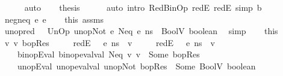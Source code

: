 \begin{isabellebody}
\ \ \ \ \isamarkupfalse%
\ auto\isanewline
\isanewline
\ \ \isamarkupfalse%
\ {\isacharquery}{\kern0pt}thesis\isanewline
\ \ \ \ \isamarkupfalse%
\ {\isacharparenleft}{\kern0pt}auto\ intro{\isacharcolon}{\kern0pt}\ RedBinOp\ redE{}\ redE{}\ simp{\isacharcolon}{\kern0pt}\ {\isacartoucheopen}b\ {\isacharequal}{\kern0pt}\ {\isacharunderscore}{\kern0pt}{\isacartoucheclose}{\isacharparenright}{\kern0pt}\isanewline
{}\isamarkupfalse%
\isanewline
\ \ \isamarkupfalse%
\ {\isacharparenleft}{\kern0pt}neg{\isacharunderscore}{\kern0pt}neq\ e{}\ e{}{\isacharparenright}{\kern0pt}\isanewline
\ \ \isamarkupfalse%
\ this\ assms\ \isamarkupfalse%
\ unop{\isacharunderscore}{\kern0pt}red{\isacharcolon}{\kern0pt}\ {\isachardoublequoteopen}{\isasymLambda}{\isacharcomma}{\kern0pt}{\isasymGamma}{\isacharcomma}{\kern0pt}{\isasymOmega}\ {\isasymturnstile}\ {\isasymlangle}UnOp\ unop{\isachardot}{\kern0pt}Not\ {\isacharparenleft}{\kern0pt}e{}\ {\isasymguillemotleft}Neq{\isasymguillemotright}\ e{}{\isacharparenright}{\kern0pt}{\isacharcomma}{\kern0pt}\ ns{\isasymrangle}\ {\isasymDown}\ BoolV\ boolean{\isachardoublequoteclose}\ \isamarkupfalse%
\ simp\isanewline
\ \ \isamarkupfalse%
\ this\ \isamarkupfalse%
\ v{}\ v{}\ bopRes\ \isanewline
\ \ \ \ redE{}{\isacharcolon}{\kern0pt}\ {\isachardoublequoteopen}{\isasymLambda}{\isacharcomma}{\kern0pt}{\isasymGamma}{\isacharcomma}{\kern0pt}{\isasymOmega}\ {\isasymturnstile}\ {\isasymlangle}e{}{\isacharcomma}{\kern0pt}\ ns{\isasymrangle}\ {\isasymDown}\ v{}{\isachardoublequoteclose}\ \isanewline
\ \ \ \ redE{}{\isacharcolon}{\kern0pt}\ {\isachardoublequoteopen}{\isasymLambda}{\isacharcomma}{\kern0pt}{\isasymGamma}{\isacharcomma}{\kern0pt}{\isasymOmega}\ {\isasymturnstile}\ {\isasymlangle}e{}{\isacharcomma}{\kern0pt}\ ns{\isasymrangle}\ {\isasymDown}\ v{}{\isachardoublequoteclose}\ \isanewline
\ \ \ \ binopEval{\isacharcolon}{\kern0pt}\ {\isachardoublequoteopen}binop{\isacharunderscore}{\kern0pt}eval{\isacharunderscore}{\kern0pt}val\ Neq\ v{}\ v{}\ {\isacharequal}{\kern0pt}\ Some\ bopRes{\isachardoublequoteclose}\ \isanewline
\ \ \ \ unopEval{\isacharcolon}{\kern0pt}\ {\isachardoublequoteopen}unop{\isacharunderscore}{\kern0pt}eval{\isacharunderscore}{\kern0pt}val\ unop{\isachardot}{\kern0pt}Not\ bopRes\ {\isacharequal}{\kern0pt}\ Some\ {\isacharparenleft}{\kern0pt}BoolV\ boolean{\isacharparenright}{\kern0pt}{\isachardoublequoteclose}\isanewline

\end{isabellebody}
